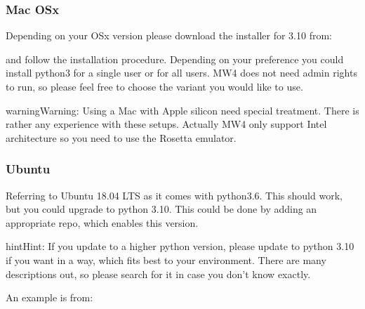 \documentclass[a4paper,10pt,english]{sphinxmanual}
\begin{document}
\subsubsection{Mac OSx}
\label{\detokenize{install/python:mac-osx}}
\sphinxAtStartPar
Depending on your OSx version please download the installer for 3.10 from:

\sphinxAtStartPar
{}

\sphinxAtStartPar
and follow the installation procedure. Depending on your preference you could install
python3 for a single user or for all users. MW4 does not need admin rights to run,
so please feel free to choose the variant you would like to use.

\begin{sphinxadmonition}{warning}{Warning:}
\sphinxAtStartPar
Using a Mac with Apple silicon need special treatment. There is rather any
experience with these setups. Actually MW4 only support Intel architecture so
you need to use the Rosetta emulator.
\end{sphinxadmonition}


\subsubsection{Ubuntu}
\label{\detokenize{install/python:ubuntu}}
\sphinxAtStartPar
Referring to Ubuntu 18.04 LTS as it comes with python3.6. This should work, but
you could upgrade to python 3.10. This could be done by adding an appropriate
repo, which enables this version.

\begin{sphinxadmonition}{hint}{Hint:}
\sphinxAtStartPar
If you update to a higher python version, please update to python 3.10 if you
want in a way, which fits best to your environment. There are many
descriptions out, so please search for it in case you don’t know exactly.
\end{sphinxadmonition}

\sphinxAtStartPar
An example is from: 

\begin{sphinxVerbatim}[commandchars=\\\{\}]
  
  
  
   
\end{sphinxVerbatim}
\end{document}
